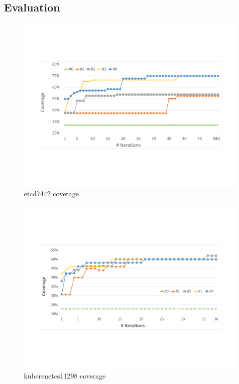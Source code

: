 \subsection{Evaluation}

\begin{figure}
\centering
  \includegraphics[width=.95\linewidth]{figs/coverage_etcd7443.pdf}
  \caption{etcd7442 coverage}
  \label{fig:etcd_coverage}
\end{figure}


\begin{figure}
\centering
  \includegraphics[width=.95\linewidth]{figs/coverage_kubernetes11298.pdf}
  \caption{kuberenetes11298 coverage}
  \label{fig:kubernetes_coverage}
\end{figure}











